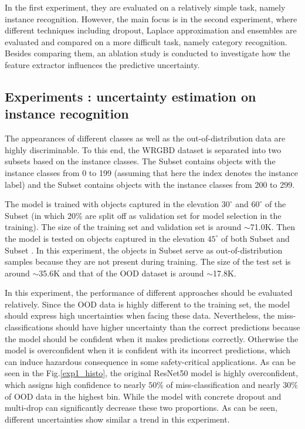In the first experiment, they are evaluated on a relatively simple task, namely instance recognition.
However, the main focus is in the second experiment, where different techniques including dropout, Laplace approximation and ensembles are evaluated and compared on a more difficult task, namely category recognition.
Besides comparing them, an ablation study is conducted to investigate how the feature extractor influences the predictive uncertainty.

\subsection{Experiments : uncertainty estimation on instance recognition}
The appearances of different classes as well as the out-of-distribution data are highly discriminable.
To this end, the WRGBD dataset is separated into two subsets based on the instance classes.
The Subset  contains objects with the instance classes from 0 to 199 (assuming that here the index denotes the instance label) and the Subset  contains objects with the instance classes from 200 to 299. 

The model is trained with objects captured in the elevation $30^\circ$ and $60^\circ$ of the Subset  (in which 20\% are split off as validation set for model selection in the training).
The size of the training set and validation set is around $\sim$71.0K.
Then the model is tested on objects captured in the elevation $45^\circ$ of both Subset  and Subset .
In this experiment, the objects in Subset  serve as out-of-distribution samples because they are not present during training.
The size of the test set is around $\sim$35.6K and that of the OOD dataset is around $\sim$17.8K. 

In this experiment, the performance of different approaches should be evaluated relatively.
Since the OOD data is highly different to the training set, the model should express high uncertainties when facing these data.
Nevertheless, the miss-classifications should have higher uncertainty than the correct predictions because the model should be confident when it makes predictions correctly.
Otherwise the model is overconfident when it is confident with its incorrect predictions, which can induce hazardous consequence in some safety-critical applications.
As can be seen in the Fig.\ref{exp1_histo}, the original ResNet50 model is highly overconfident, which assigns high confidence to nearly $50\%$ of miss-classification and nearly $30\%$ of OOD data in the highest bin.
While the model with concrete dropout and multi-drop can significantly decrease these two proportions.
As can be seen, different uncertainties show similar a trend in this experiment.

